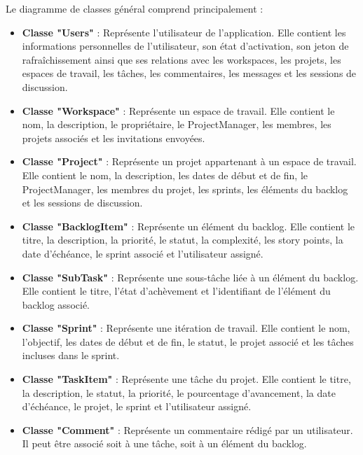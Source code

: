 Le diagramme de classes général comprend principalement :
\begin{itemize}
  \item[$\bullet$] \textbf{Classe "Users"} : Représente l'utilisateur de l'application. Elle contient les informations personnelles de l'utilisateur, son état d'activation, son jeton de rafraîchissement ainsi que ses relations avec les workspaces, les projets, les espaces de travail, les tâches, les commentaires, les messages et les sessions de discussion.

  \item[$\bullet$] \textbf{Classe "Workspace"} : Représente un espace de travail. Elle contient le nom, la description, le propriétaire, le ProjectManager, les membres, les projets associés et les invitations envoyées.

  \item[$\bullet$] \textbf{Classe "Project"} : Représente un projet appartenant à un espace de travail. Elle contient le nom, la description, les dates de début et de fin, le ProjectManager, les membres du projet, les sprints, les éléments du backlog et les sessions de discussion.

  \item[$\bullet$] \textbf{Classe "BacklogItem"} : Représente un élément du backlog. Elle contient le titre, la description, la priorité, le statut, la complexité, les story points, la date d'échéance, le sprint associé et l'utilisateur assigné.

  \item[$\bullet$] \textbf{Classe "SubTask"} : Représente une sous-tâche liée à un élément du backlog. Elle contient le titre, l'état d'achèvement et l'identifiant de l'élément du backlog associé.

  \item[$\bullet$] \textbf{Classe "Sprint"} : Représente une itération de travail. Elle contient le nom, l'objectif, les dates de début et de fin, le statut, le projet associé et les tâches incluses dans le sprint.

  \item[$\bullet$] \textbf{Classe "TaskItem"} : Représente une tâche du projet. Elle contient le titre, la description, le statut, la priorité, le pourcentage d'avancement, la date d'échéance, le projet, le sprint et l'utilisateur assigné.

  \item[$\bullet$] \textbf{Classe "Comment"} : Représente un commentaire rédigé par un utilisateur. Il peut être associé soit à une tâche, soit à un élément du backlog.


\end{itemize}
